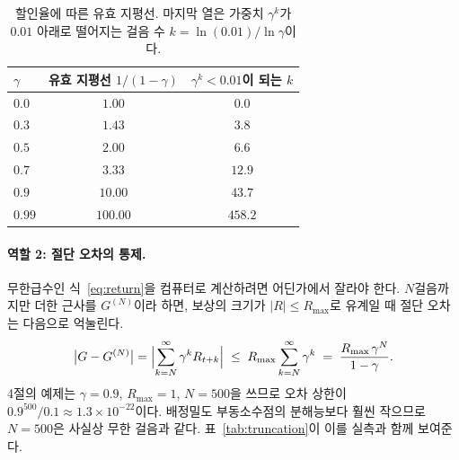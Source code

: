 \documentclass[11pt,a4paper]{article}
\begin{document}
\begin{table}[htbp]
\centering
\caption{할인율에 따른 유효 지평선. 마지막 열은 가중치 $\gamma^k$가 $0.01$ 아래로 떨어지는 걸음 수
$k=\ln(0.01)/\ln\gamma$이다.}
\label{tab:horizon}
\small
\begin{tabular}{@{}lcc@{}}
\toprule
$\gamma$ & 유효 지평선 $1/(1-\gamma)$ & $\gamma^k<0.01$이 되는 $k$ \\
\midrule
$0.0$  & $1.00$   & $0.0$   \\
$0.3$  & $1.43$   & $3.8$   \\
$0.5$  & $2.00$   & $6.6$   \\
$0.7$  & $3.33$   & $12.9$  \\
$0.9$  & $10.00$  & $43.7$  \\
$0.99$ & $100.00$ & $458.2$ \\
\bottomrule
\end{tabular}
\end{table}

\paragraph{역할 2: 절단 오차의 통제.}
무한급수인 식~\eqref{eq:return}을 컴퓨터로 계산하려면 어딘가에서 잘라야 한다. $N$걸음까지만 더한
근사를 $G^{(N)}$이라 하면, 보상의 크기가 $|R|\le R_{\max}$로 유계일 때 절단 오차는 다음으로 억눌린다.
\begin{equation}
  \bigl|G - G^{(N)}\bigr|
  = \Bigl|\sum_{k=N}^{\infty}\gamma^k R_{t+k}\Bigr|
  \;\le\; R_{\max}\sum_{k=N}^{\infty}\gamma^k
  \;=\; \frac{R_{\max}\,\gamma^{N}}{1-\gamma}.
  \label{eq:truncation}
\end{equation}
4절의 예제는 $\gamma=0.9$, $R_{\max}=1$, $N=500$을 쓰므로 오차 상한이
$0.9^{500}/0.1 \approx 1.3\times10^{-22}$이다. 배정밀도 부동소수점의 분해능보다 훨씬 작으므로
$N=500$은 사실상 무한 걸음과 같다. 표~\ref{tab:truncation}이 이를 실측과 함께 보여준다.
\end{document}
